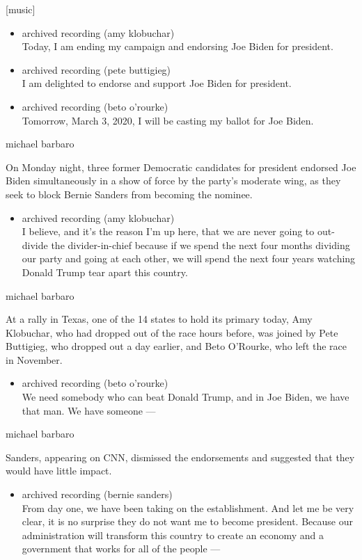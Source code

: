 {[}music{]}

\begin{itemize}
\item
  archived recording (amy klobuchar)\\
  Today, I am ending my campaign and endorsing Joe Biden for president.
\item
  archived recording (pete buttigieg)\\
  I am delighted to endorse and support Joe Biden for president.
\item
  archived recording (beto o'rourke)\\
  Tomorrow, March 3, 2020, I will be casting my ballot for Joe Biden.
\end{itemize}

michael barbaro

On Monday night, three former Democratic candidates for president
endorsed Joe Biden simultaneously in a show of force by the party's
moderate wing, as they seek to block Bernie Sanders from becoming the
nominee.

\begin{itemize}
\tightlist
\item
  archived recording (amy klobuchar)\\
  I believe, and it's the reason I'm up here, that we are never going to
  out-divide the divider-in-chief because if we spend the next four
  months dividing our party and going at each other, we will spend the
  next four years watching Donald Trump tear apart this country.
\end{itemize}

michael barbaro

At a rally in Texas, one of the 14 states to hold its primary today, Amy
Klobuchar, who had dropped out of the race hours before, was joined by
Pete Buttigieg, who dropped out a day earlier, and Beto O'Rourke, who
left the race in November.

\begin{itemize}
\tightlist
\item
  archived recording (beto o'rourke)\\
  We need somebody who can beat Donald Trump, and in Joe Biden, we have
  that man. We have someone ---
\end{itemize}

michael barbaro

Sanders, appearing on CNN, dismissed the endorsements and suggested that
they would have little impact.

\begin{itemize}
\tightlist
\item
  archived recording (bernie sanders)\\
  From day one, we have been taking on the establishment. And let me be
  very clear, it is no surprise they do not want me to become president.
  Because our administration will transform this country to create an
  economy and a government that works for all of the people ---
\end{itemize}


